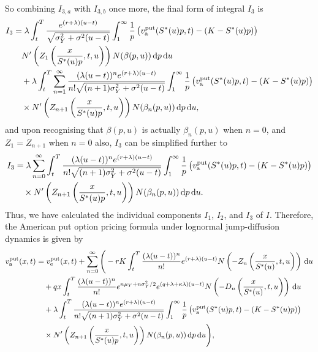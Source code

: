 		So combining $I_{3,a}$ with $I_{3,b}$ once more, the final form of integral $I_3$ is
		\begin{align*}
			I_3 &=   \lambda  \int_t^T \frac{e^{(r+\lambda)(u-t)}}{\sqrt{\sigma_Y^2 + \sigma^2(u-t)}} \int_1^\infty \frac{1}{p} \left( v_{\text{a}}^{\text{put}}(S^*(u)p,t) - (K-S^*(u)p) \right)  \\
			&\quad {} N'\left( Z_1 \left( \frac{x}{S^*(u)p}, t, u \right)\right)N(\beta(p,u)) \, \mathrm d p \, \mathrm d u \\
			& \quad{} + \lambda \int_t^T \displaystyle\sum\limits_{n=1}^{\infty} \frac{(\lambda(u-t))^ne^{(r+\lambda)(u-t)}}{n!\sqrt{(n+1)\sigma_Y^2 + \sigma^2(u-t)}}\int_1^\infty \frac{1}{p}\left( v_{\text{a}}^{\text{put}}(S^*(u)p,t) - (K-S^*(u)p) \right) \\
			&\quad {} \times N'\left( Z_{n+1}\left( \frac{x}{S^*(u)p}, t, u \right)\right)N(\beta_n(p,u))  \, \mathrm d p \, \mathrm d u,
		\end{align*}
		and upon recognising that $\beta(p,u)$ is actually $\beta_n(p,u)$ when $n=0$, and $Z_1 = Z_{n+1}$ when $n=0$ also, $I_3$ can be simplified further to
		\begin{equation}
			\label{eqn:I3put}
			\begin{split}
			I_3 &= \lambda \displaystyle\sum\limits_{n=0}^{\infty} \int_t^T  \frac{(\lambda(u-t))^ne^{(r+\lambda)(u-t)}}{n!\sqrt{(n+1)\sigma_Y^2 + \sigma^2(u-t)}}\int_1^\infty \frac{1}{p}\left( v_{\text{a}}^{\text{put}}(S^*(u)p,t) - (K-S^*(u)p) \right) \\
			&\quad {} \times N'\left( Z_{n+1}\left( \frac{x}{S^*(u)p}, t, u \right)\right)N(\beta_n(p,u))  \, \mathrm d p \, \mathrm d u.
			\end{split}
		\end{equation}
		Thus, we have calculated the individual components $I_1$, $I_2$, and $I_3$ of $I$. Therefore, the American put option pricing formula under lognormal jump-diffusion dynamics is given by
		\begin{equation}
			\label{eqn:amerputjumpLN}
			\begin{split}
				 v_{\text{a}}^{\text{put}}(x,t) &=  v_{\text{e}}^{\text{put}}(x,t) + \displaystyle\sum\limits_{n=0}^\infty \Bigg( -rK\int_t^T  \frac{(\lambda(u-t))^n}{n!} e^{(r+\lambda)(u-t)} N\left(-Z_n \left( \frac{x}{S^*(u)},t,u  \right) \right) \, \mathrm d u \\
				 &\quad{} +qx \int_t^T   \frac{(\lambda(u-t))^n}{n!} e^{n\mu_Y + n\sigma_Y^2/2} e^{(q+\lambda + \kappa\lambda)(u-t)} N\left( -D_n \left( \frac{x}{S^*(u)},t,u  \right) \right) \, \mathrm d u \\
				&\quad{} +  \lambda \int_t^T  \frac{(\lambda(u-t))^ne^{(r+\lambda)(u-t)}}{n!\sqrt{(n+1)\sigma_Y^2 + \sigma^2(u-t)}}\int_1^\infty \frac{1}{p}\left( v_{\text{a}}^{\text{put}}(S^*(u)p,t) - (K-S^*(u)p) \right) \\
			&\quad {} \times N'\left( Z_{n+1}\left( \frac{x}{S^*(u)p}, t, u \right)\right)N(\beta_n(p,u))  \, \mathrm d p \, \mathrm d u  \Bigg),
			\end{split}
		\end{equation}
